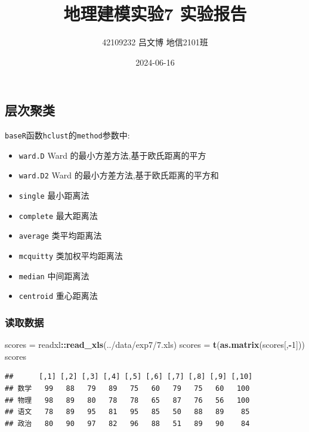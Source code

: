 \documentclass[
]{article}
\title{地理建模实验7 实验报告}
\author{42109232 \quad 吕文博 \quad 地信2101班}
\date{2024-06-16}
\newenvironment{Shaded}{\begin{snugshade}}{\end{snugshade}}
\newcommand{\DecValTok}[1]{\textcolor[rgb]{0.00,0.00,0.81}{#1}}
\newcommand{\FunctionTok}[1]{\textcolor[rgb]{0.13,0.29,0.53}{\textbf{#1}}}
\newcommand{\NormalTok}[1]{#1}
\newcommand{\OtherTok}[1]{\textcolor[rgb]{0.56,0.35,0.01}{#1}}
\newcommand{\SpecialCharTok}[1]{\textcolor[rgb]{0.81,0.36,0.00}{\textbf{#1}}}
\newcommand{\StringTok}[1]{\textcolor[rgb]{0.31,0.60,0.02}{#1}}
\begin{document}
\maketitle

\subsection{层次聚类}\label{ux5c42ux6b21ux805aux7c7b}

\texttt{baseR}函数\texttt{hclust}的\texttt{method}参数中:

\begin{itemize}
\item
  \texttt{ward.D} Ward 的最小方差方法,基于欧氏距离的平方
\item
  \texttt{ward.D2} Ward 的最小方差方法,基于欧氏距离的平方和
\item
  \texttt{single} 最小距离法
\item
  \texttt{complete} 最大距离法
\item
  \texttt{average} 类平均距离法
\item
  \texttt{mcquitty} 类加权平均距离法
\item
  \texttt{median} 中间距离法
\item
  \texttt{centroid} 重心距离法
\end{itemize}

\subsubsection{读取数据}\label{ux8bfbux53d6ux6570ux636e}

\begin{Shaded}
\begin{Highlighting}[]
\NormalTok{scores }\OtherTok{=}\NormalTok{ readxl}\SpecialCharTok{::}\FunctionTok{read\_xls}\NormalTok{(}\StringTok{\textquotesingle{}../data/exp7/7.xls\textquotesingle{}}\NormalTok{)}
\NormalTok{scores }\OtherTok{=} \FunctionTok{t}\NormalTok{(}\FunctionTok{as.matrix}\NormalTok{(scores[,}\SpecialCharTok{{-}}\DecValTok{1}\NormalTok{]))}
\NormalTok{scores}
\end{Highlighting}
\end{Shaded}

\begin{verbatim}
##      [,1] [,2] [,3] [,4] [,5] [,6] [,7] [,8] [,9] [,10]
## 数学   99   88   79   89   75   60   79   75   60   100
## 物理   98   89   80   78   78   65   87   76   56   100
## 语文   78   89   95   81   95   85   50   88   89    85
## 政治   80   90   97   82   96   88   51   89   90    84
\end{verbatim}
\end{document}
